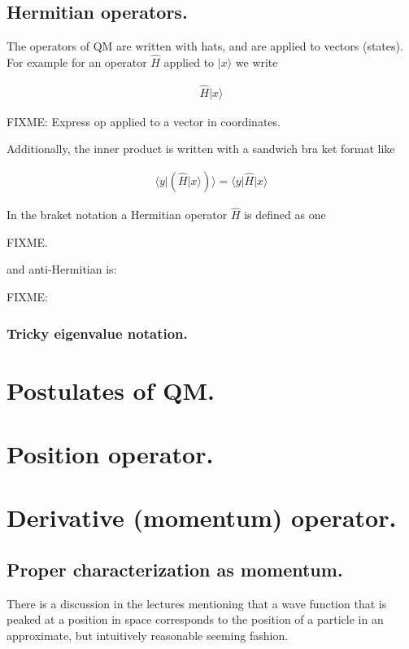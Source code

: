 \documentclass{article}
\newcommand{\ket}[1]{\lvert {#1} \rangle}
\newcommand{\bra}[1]{\langle {#1} \rvert}
\newcommand{\braket}[2]{\langle{#1} \vert {#2}\rangle}
\newcommand{\BraOpKet}[3]{\bra{#1} \hat{#2} \ket{#3} }
\begin{document}
\subsection{ Hermitian operators. }

The operators of QM are written with hats, and are applied to vectors (states).  For example for an 
operator $\hat{H}$ applied to $\ket{x}$ we write

\begin{align*}
\hat{H} \ket{x}
\end{align*}

FIXME: Express op applied to a vector in coordinates.

Additionally, the inner product is written with a sandwich bra ket format like

\begin{align*}
\braket{y}{ \left(\hat{H} \ket{x} \right) }
=
\BraOpKet{y}{H}{x}
\end{align*}

In the braket notation a Hermitian operator $\hat{H}$ is defined as one 

FIXME.

and anti-Hermitian is:

FIXME:

\subsubsection{ Tricky eigenvalue notation. } 



\section{ Postulates of QM. }



\section{ Position operator. }

\section{ Derivative (momentum) operator. }

\subsection{ Proper characterization as momentum. }

There is a discussion in the lectures mentioning that a wave function that is peaked at a position in space
corresponds to the position of a particle in an approximate, but intuitively reasonable seeming fashion.
\end{document}
